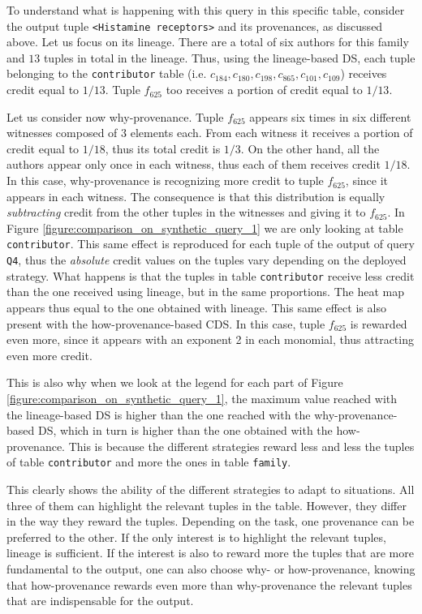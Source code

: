 To understand what is happening with this query in this specific table, consider the output tuple \texttt{<Histamine receptors>} and its provenances, as discussed above.
Let us focus on its lineage. There are a total of six authors for this family and $13$ tuples in total in the lineage. 
Thus, using the lineage-based DS, each tuple belonging to the \texttt{contributor} table (i.e. $c_{184}, c_{180}, c_{198}, c_{865}, c_{101}, c_{109}$) receives credit equal to $1/13$.
Tuple $f_{625}$ too receives a portion of credit equal to $1/13$.

Let us consider now why-provenance. Tuple $f_{625}$ appears six times in six different witnesses composed of $3$ elements each. From each witness it receives a portion of credit equal to $1/18$, thus its total credit is $1/3$.
On the other hand, all the authors appear only once in each witness, thus each of them receives credit $1/18$. 
In this case, why-provenance is recognizing more credit to tuple $f_{625}$, since it appears in each witness. The consequence is that this distribution is equally \emph{subtracting} credit from the other tuples in the witnesses and giving it to $f_{625}$. 
In Figure \ref{figure:comparison_on_synthetic_query_1} we are only looking at table \texttt{contributor}. 
This same effect is reproduced for each tuple of the output of query \texttt{Q4}, thus the \emph{absolute} credit values on the tuples vary depending on the deployed strategy. 
What happens is that the tuples in table \texttt{contributor} receive less credit than the one received using lineage, but in the same proportions. The heat map appears thus equal to the one obtained with lineage.
This same effect is also present with the how-provenance-based CDS. In this case, tuple $f_{625}$ is rewarded even more, since it appears with an exponent 2 in each monomial, thus attracting even more credit. 

This is also why when we look at the legend for each part of Figure \ref{figure:comparison_on_synthetic_query_1}, the maximum value reached with the lineage-based DS is higher than the one reached with the why-provenance-based DS, which in turn is higher than the one obtained with the how-provenance. This is because the different strategies reward less and less the tuples of table \texttt{contributor} and more the ones in table \texttt{family}. 

This clearly shows the ability of the different strategies to adapt to situations. All three of them can highlight the relevant tuples in the table. However, they differ in the way they reward the tuples. 
Depending on the task, one provenance can be preferred to the other. 
If the only interest is to highlight the relevant tuples, lineage is sufficient. 
If the interest is also to reward more the tuples that are more fundamental to the output, one can also choose why- or how-provenance, knowing that how-provenance rewards even more than why-provenance the relevant tuples that are indispensable for the output.  


